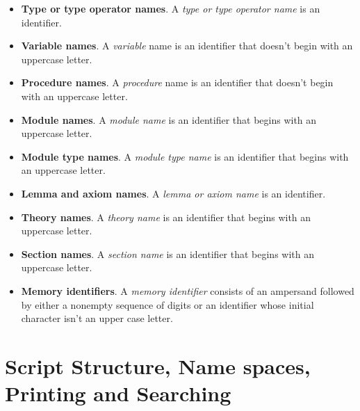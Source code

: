 \begin{itemize}
\item \textbf{Type or type operator names}. A \emph{type or type
  operator name} is an identifier.

\item \textbf{Variable names}. A \emph{variable} name is an identifier
  that doesn't begin with an uppercase letter.

\item \textbf{Procedure names}. A \emph{procedure} name is an identifier
  that doesn't begin with an uppercase letter.

\item \textbf{Module names}. A \emph{module name} is an identifier that
  begins with an uppercase letter.

\item \textbf{Module type names}. A \emph{module type name} is an
  identifier that begins with an uppercase letter.

\item \textbf{Lemma and axiom names}. A \emph{lemma or axiom
    name} is an identifier.

\item \textbf{Theory names}. A \emph{theory name} is an
  identifier that begins with an uppercase letter.

\item \textbf{Section names}. A \emph{section name} is an
  identifier that begins with an uppercase letter.

\item \textbf{Memory identifiers}. A \emph{memory identifier} consists of
  an ampersand followed by either a nonempty sequence of digits or an
  identifier whose initial character isn't an upper case letter.
\end{itemize}

\section{Script Structure, Name spaces, Printing and Searching}

